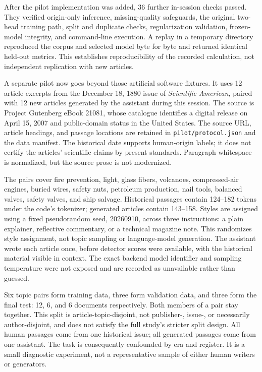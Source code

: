 \documentclass[11pt]{article}
\begin{document}
After the pilot implementation was added, 36 further in-session checks passed.
They verified origin-only inference, missing-quality safeguards, the original
two-head training path, split and duplicate checks, regularization validation,
frozen-model integrity, and command-line execution. A replay in a temporary
directory reproduced the corpus and selected model byte for byte and returned
identical held-out metrics. This establishes reproducibility of the recorded
calculation, not independent replication with new articles.

A separate pilot now goes beyond those artificial software fixtures. It uses
12 article excerpts from the December 18, 1880 issue of \emph{Scientific
American}, paired with 12 new articles generated by the assistant during
this session. The source is Project Gutenberg eBook 21081, whose catalogue
identifies a digital release on April 15, 2007 and public-domain status in the
United States. The source URL, article headings, and passage locations are
retained in \texttt{pilot/protocol.json} and the data manifest. The historical
date supports human-origin labels; it does not certify the articles' scientific
claims by present standards. Paragraph whitespace is normalized, but the
source prose is not modernized.

The pairs cover fire prevention, light, glass fibers, volcanoes, compressed-air
engines, buried wires, safety nuts, petroleum production, nail tools, balanced
valves, safety valves, and ship salvage. Historical passages contain
124--182 tokens under the code's tokenizer; generated articles contain
143--158. Styles are assigned using a fixed pseudorandom seed, 20260910,
across three instructions: a plain explainer, reflective commentary, or a
technical magazine note. This randomizes style assignment, not topic sampling
or language-model generation. The assistant wrote each article once, before
detector scores were available, with the historical material visible in
context. The exact backend model identifier and sampling temperature were
not exposed and are recorded as unavailable rather than guessed.

Six topic pairs form training data, three form validation data, and three
form the final test: 12, 6, and 6 documents respectively. Both members of a
pair stay together. This split is article-topic-disjoint, not publisher-,
issue-, or necessarily author-disjoint, and does not satisfy the full study's
stricter split design. All human passages come from one historical issue;
all generated passages come from one assistant. The task is consequently
confounded by era and register. It is a small diagnostic experiment, not a
representative sample of either human writers or generators.
\end{document}
